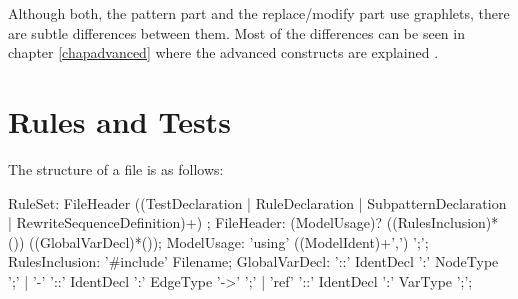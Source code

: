 \begin{figure}[htbp]
\end{figure}

\begin{warning}
	Although both, the pattern part and the replace/modify part use graphlets, there are subtle differences between them.
	Most of the differences can be seen in chapter \ref{chapadvanced} where the advanced constructs are explained .
\end{warning}


\section{Rules and Tests}
\label{ruledecls}
The structure of a  file is as follows:
\begin{rail}
  RuleSet: FileHeader ((TestDeclaration | RuleDeclaration | SubpatternDeclaration | RewriteSequenceDefinition)+) ;
  FileHeader: (ModelUsage)? ((RulesInclusion)*()) ((GlobalVarDecl)*());
  ModelUsage: 'using' ((ModelIdent)+',') ';';
  RulesInclusion: '\#include' Filename;
  GlobalVarDecl: '::' IdentDecl ':' NodeType ';' | '-' '::' IdentDecl ':' EdgeType '->' ';' | 'ref' '::' IdentDecl ':' VarType ';';
\end{rail}

